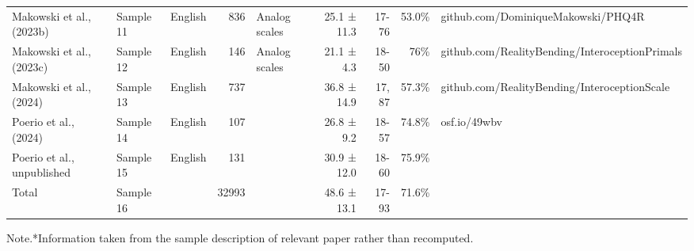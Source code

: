 \begin{table}[!t]
\begin{tabular*}{\linewidth}{@{\extracolsep{\fill}}lllrlrrrl}
Makowski et al., (2023b) & Sample 11 & English & 836 & Analog scales & 25.1 ± 11.3 & 17-76 & 53.0\% & github.com/DominiqueMakowski/PHQ4R \\ 
Makowski et al., (2023c) & Sample 12 & English & 146 & Analog scales & 21.1 ± 4.3 & 18-50 & 76\% & github.com/RealityBending/InteroceptionPrimals \\ 
Makowski et al., (2024) & Sample 13 & English & 737 &  & 36.8 ± 14.9 & 17, 87 & 57.3\% & github.com/RealityBending/InteroceptionScale \\ 
Poerio et al., (2024) & Sample 14 & English & 107 &  & 26.8 ± 9.2 & 18-57 & 74.8\% & osf.io/49wbv \\ 
Poerio et al., unpublished & Sample 15 & English & 131 &  & 30.9 ± 12.0 & 18-60 & 75.9\% &  \\ 
Total & Sample 16 &  & 32993 &  & 48.6 ± 13.1 & 17-93 & 71.6\% &  \\ 
\bottomrule
\end{tabular*}
\begin{minipage}{\linewidth}
Note.*Information taken from the sample description of relevant paper rather than recomputed.\\
\end{minipage}
\end{table}

